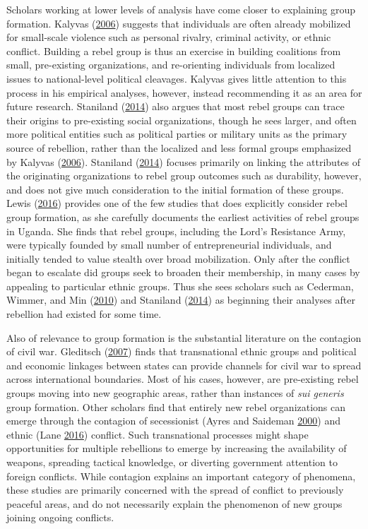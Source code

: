 \documentclass[12pt,]{book}
\theoremstyle{definition}
\theoremstyle{definition}
\theoremstyle{definition}
\theoremstyle{remark}
\begin{document}
Scholars working at lower levels of analysis have come closer to
explaining group formation. Kalyvas
(\protect\hyperlink{ref-Kalyvas2006}{2006}) suggests that individuals
are often already mobilized for small-scale violence such as personal
rivalry, criminal activity, or ethnic conflict. Building a rebel group
is thus an exercise in building coalitions from small, pre-existing
organizations, and re-orienting individuals from localized issues to
national-level political cleavages. Kalyvas gives little attention to
this process in his empirical analyses, however, instead recommending it
as an area for future research. Staniland
(\protect\hyperlink{ref-Staniland2014}{2014}) also argues that most
rebel groups can trace their origins to pre-existing social
organizations, though he sees larger, and often more political entities
such as political parties or military units as the primary source of
rebellion, rather than the localized and less formal groups emphasized
by Kalyvas (\protect\hyperlink{ref-Kalyvas2006}{2006}). Staniland
(\protect\hyperlink{ref-Staniland2014}{2014}) focuses primarily on
linking the attributes of the originating organizations to rebel group
outcomes such as durability, however, and does not give much
consideration to the initial formation of these groups. Lewis
(\protect\hyperlink{ref-Lewis2016}{2016}) provides one of the few
studies that does explicitly consider rebel group formation, as she
carefully documents the earliest activities of rebel groups in Uganda.
She finds that rebel groups, including the Lord's Resistance Army, were
typically founded by small number of entrepreneurial individuals, and
initially tended to value stealth over broad mobilization. Only after
the conflict began to escalate did groups seek to broaden their
membership, in many cases by appealing to particular ethnic groups. Thus
she sees scholars such as Cederman, Wimmer, and Min
(\protect\hyperlink{ref-Cederman2010}{2010}) and Staniland
(\protect\hyperlink{ref-Staniland2014}{2014}) as beginning their
analyses after rebellion had existed for some time.

Also of relevance to group formation is the substantial literature on
the contagion of civil war. Gleditsch
(\protect\hyperlink{ref-Gleditsch2007}{2007}) finds that transnational
ethnic groups and political and economic linkages between states can
provide channels for civil war to spread across international
boundaries. Most of his cases, however, are pre-existing rebel groups
moving into new geographic areas, rather than instances of \emph{sui
generis} group formation. Other scholars find that entirely new rebel
organizations can emerge through the contagion of secessionist (Ayres
and Saideman \protect\hyperlink{ref-Ayres2000}{2000}) and ethnic (Lane
\protect\hyperlink{ref-Lane2016}{2016}) conflict. Such transnational
processes might shape opportunities for multiple rebellions to emerge by
increasing the availability of weapons, spreading tactical knowledge, or
diverting government attention to foreign conflicts. While contagion
explains an important category of phenomena, these studies are primarily
concerned with the spread of conflict to previously peaceful areas, and
do not necessarily explain the phenomenon of new groups joining ongoing
conflicts.
\end{document}
